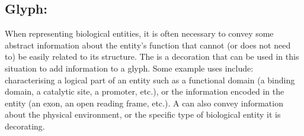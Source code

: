 
\subsection{Glyph: }
\label{sec:unitInfo}

When representing biological entities, it is often necessary to convey some abstract information about the entity's function that cannot (or does not need to) be easily related to its structure.
The  is a decoration that can be used in this situation to add information to a glyph.
Some example uses include: characterising a logical part of an entity such as a functional domain (a binding domain, a catalytic site, a promoter, etc.), or the information encoded in the entity (an exon, an open reading frame, etc.).
A  can also convey information about the physical environment, or the specific type of biological entity it is decorating.

